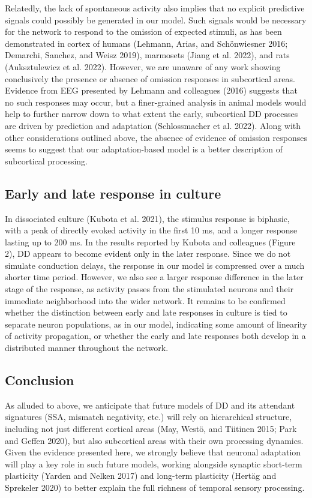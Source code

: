 \documentclass[pdflatex,referee,iicol,sn-basic]{sn-jnl}
\begin{document}
Relatedly, the lack of spontaneous activity also implies that no explicit predictive signals could possibly be generated in our model. Such signals would be necessary for the network to respond to the omission of expected stimuli, as has been demonstrated in cortex of humans (Lehmann, Arias, and Schönwiesner 2016; Demarchi, Sanchez, and Weisz 2019), marmosets (Jiang et al. 2022), and rats (Auksztulewicz et al. 2022). However, we are unaware of any work showing conclusively the presence or absence of omission responses in subcortical areas. Evidence from EEG presented by Lehmann and colleagues (2016) suggests that no such responses may occur, but a finer-grained analysis in animal models would help to further narrow down to what extent the early, subcortical DD processes are driven by prediction and adaptation (Schlossmacher et al. 2022). Along with other considerations outlined above, the absence of evidence of omission responses seems to suggest that our adaptation-based model is a better description of subcortical processing.

\subsection{Early and late response in culture}

In dissociated culture (Kubota et al. 2021), the stimulus response is biphasic, with a peak of directly evoked activity in the first 10 ms, and a longer response lasting up to 200 ms. In the results reported by Kubota and colleagues (Figure 2), DD appears to become evident only in the later response. Since we do not simulate conduction delays, the response in our model is compressed over a much shorter time period. However, we also see a larger response difference in the later stage of the response, as activity passes from the stimulated neurons and their immediate neighborhood into the wider network. It remains to be confirmed whether the distinction between early and late responses in culture is tied to separate neuron populations, as in our model, indicating some amount of linearity of activity propagation, or whether the early and late responses both develop in a distributed manner throughout the network.

\subsection{Conclusion}

As alluded to above, we anticipate that future models of DD and its attendant signatures (SSA, mismatch negativity, etc.) will rely on hierarchical structure, including not just different cortical areas (May, Westö, and Tiitinen 2015; Park and Geffen 2020), but also subcortical areas with their own processing dynamics. Given the evidence presented here, we strongly believe that neuronal adaptation will play a key role in such future models, working alongside synaptic short-term plasticity (Yarden and Nelken 2017) and long-term plasticity (Hertäg and Sprekeler 2020) to better explain the full richness of temporal sensory processing.
\end{document}
